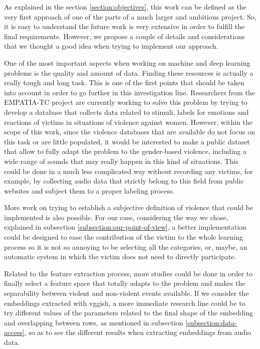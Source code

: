 
	As explained in the section \ref{section:objectives}, this work can be defined as the very first approach of one of the parts of a much larger and ambitious project. So, it is easy to understand the future work is very extensive in order to fulfill the final requirements. However, we propose a couple of details and considerations that we thought a good idea when trying to implement our approach.
	
	One of the most important aspects when working on machine and deep learning problems is the quality and amount of data. Finding these resources is actually a really tough and long task. This is one of the first points that should be taken into account in order to go further in this investigation line. Researchers from the EMPATIA-TC project are currently working to solve this problem by trying to develop a database that collects data related to stimuli, labels for emotions and reactions of victims \cite{UC3M4SafetyTeam2018} in situations of violence against women. However, within the scope of this work, since the violence databases that are available do not focus on this task or are little populated, it would be interested to make a public dataset that allow to fully adapt the problem to the gender-based violence, including a wide range of sounds that may really happen in this kind of situations. This could be done in a much less complicated way without recording any victims, for example, by collecting audio data that strictly belong to this field from public websites and subject them to a proper labeling process.
	
	More work on trying to establish a subjective definition of violence that could be implemented is also possible. For our case, considering the way we chose, explained in subsection \ref{subsection:our-point-of-view}, a better implementation could be designed to ease the contribution of the victim to the whole learning process so it is not so annoying to be selecting all the categories, or, maybe, an automatic system in which the victim does not need to directly participate.
	
	Related to the feature extraction process, more studies could be done in order to finally select a feature space that totally adapts to the problem and makes the separability between violent and non-violent events available. If we consider the embeddings extracted with \acrshort{vgg}ish, a more immediate research line could be to try different values of the parameters related to the final shape of the embedding and overlapping between rows, as mentioned in subsection \ref{subsection:data-access}, so as to see the different results when extracting embeddings from audio data.
	
